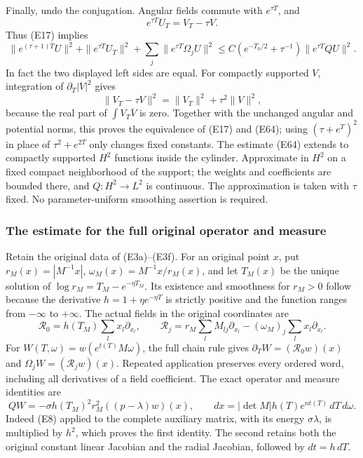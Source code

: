 \documentclass[
  11pt,
]{article}
\makeatletter
\let\ReaderOriginalAnchorStart\hyper@anchorstart
\let\ReaderOriginalAnchorEnd\hyper@anchorend
\let\ReaderPendingAliases\@empty
\def\ReaderArmAliases#1{\gdef\ReaderPendingAliases{#1}}
\def\hyper@anchorstart#1{\ReaderIfNativeAnchorTF{#1}{\ReaderPendingAliases\global\let\ReaderPendingAliases\@empty}{}\ReaderOriginalAnchorStart{#1}}
\makeatother
\begin{document}
Finally, undo the conjugation. Angular fields commute with
\(e^{\tau T}\), and \[
                 e^{\tau T}U_T=V_T-\tau V.
\] Thus (E17) implies \[
 \|e^{(\tau+1)T}U\|^2
  +\|e^{\tau T}U_T\|^2
  +\sum_j\|e^{\tau T}\Omega_jU\|^2
 \leq C\left(e^{-T_0/2}+\tau^{-1}\right)
                                  \|e^{\tau T}QU\|^2.           \tag{E64}
\] In fact the two displayed left sides are equal. For compactly
supported \(V\), integration of \(\partial_T|V|^2\) gives \[
 \|V_T-\tau V\|^2=\|V_T\|^2+\tau^2\|V\|^2,
\] because the real part of \(\int V_T\overline V\) is zero. Together
with the unchanged angular and potential norms, this proves the
equivalence of (E17) and (E64); using \((\tau+e^T)^2\) in place of
\(\tau^2+e^{2T}\) only changes fixed constants. The estimate (E64)
extends to compactly supported \(H^2\) functions inside the cylinder.
Approximate in \(H^2\) on a fixed compact neighborhood of the support;
the weights and coefficients are bounded there, and \(Q:H^2\to L^2\) is
continuous. The approximation is taken with \(\tau\) fixed. No
parameter-uniform smoothing assertion is required.

\ReaderArmAliases{\ReaderOriginalAnchorStart{the-estimate-for-the-full-original-operator-and-measure}\ReaderOriginalAnchorEnd}
\subsubsection{The estimate for the full original operator and
measure}\label{the-estimate-for-the-full-original-operator-and-measure}

Retain the original data of (E3a)--(E3f). For an original point \(x\),
put \(r_M(x)=|M^{-1}x|\), \(\omega_M(x)=M^{-1}x/r_M(x)\), and let
\(T_M(x)\) be the unique solution of \(\log r_M=T_M-e^{-\eta T_M}\). Its
existence and smoothness for \(r_M>0\) follow because the derivative
\(h=1+\eta e^{-\eta T}\) is strictly positive and the function ranges
from \(-\infty\) to \(+\infty\). The actual fields in the original
coordinates are \[
 \mathcal R_0=h(T_M)\sum_lx_l\partial_{x_l},\qquad
 \mathcal R_j=r_M\sum_lM_{lj}\partial_{x_l}
                 -(\omega_M)_j\sum_lx_l\partial_{x_l}.          \tag{E77}
\] For \(W(T,\omega)=w(e^{t(T)}M\omega)\), the full chain rule gives
\(\partial_TW=(\mathcal R_0w)(x)\) and \(\Omega_jW=(\mathcal R_jw)(x)\).
Repeated application preserves every ordered word, including all
derivatives of a field coefficient. The exact operator and measure
identities are \[
 QW=-\sigma h(T_M)^2r_M^2((p-\lambda)w)(x),\qquad
 dx=|\det M|h(T)e^{nt(T)}\,dT\,d\omega.                        \tag{E78}
\] Indeed (E8) applied to the complete auxiliary matrix, with its energy
\(\sigma\lambda\), is multiplied by \(h^2\), which proves the first
identity. The second retains both the original constant linear Jacobian
and the radial Jacobian, followed by \(dt=h\,dT\).
\end{document}
